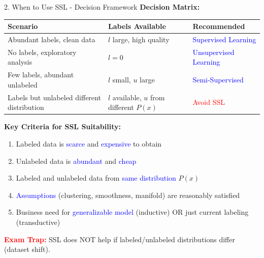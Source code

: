 \documentclass[8pt]{beamer}
\begin{document}
	\begin{frame}{2. When to Use SSL - Decision Framework}
		\fontsize{6.5}{7.5}\selectfont
		\textbf{Decision Matrix:}
		
		\begin{tabular}{|p{3.2cm}|p{3.2cm}|p{3.2cm}|}
			\hline
			\textbf{Scenario} & \textbf{Labels Available} & \textbf{Recommended} \\
			\hline
			Abundant labels, clean data & $l$ large, high quality & \textcolor{blue}{Supervised Learning} \\
			\hline
			No labels, exploratory analysis & $l = 0$ & \textcolor{blue}{Unsupervised Learning} \\
			\hline
			Few labels, abundant unlabeled & $l$ small, $u$ large & \textcolor{blue}{Semi-Supervised} \\
			\hline
			Labels but unlabeled different distribution & $l$ available, $u$ from different $P(x)$ & \textcolor{red}{Avoid SSL} \\
			\hline
		\end{tabular}
		
		\textbf{Key Criteria for SSL Suitability:}
		\begin{enumerate}
			\item Labeled data is \textcolor{blue}{scarce} and \textcolor{blue}{expensive} to obtain
			\item Unlabeled data is \textcolor{blue}{abundant} and \textcolor{blue}{cheap}
			\item Labeled and unlabeled data from \textcolor{blue}{same distribution} $P(x)$
			\item \textcolor{blue}{Assumptions} (clustering, smoothness, manifold) are reasonably satisfied
			\item Business need for \textcolor{blue}{generalizable model} (inductive) OR just current labeling (transductive)
		\end{enumerate}
		
		\textcolor{red}{\textbf{Exam Trap:}} SSL does NOT help if labeled/unlabeled distributions differ (dataset shift).
	\end{frame}
	
\end{document}
